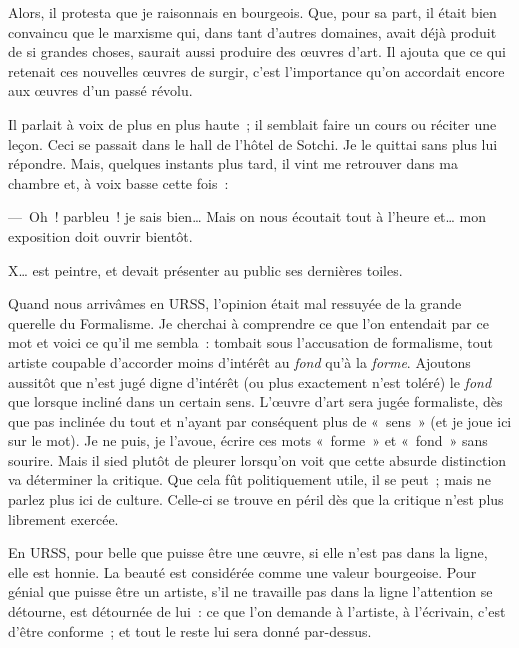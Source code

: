\documentclass[twoside]{book} %
\newcommand{\astermono}{\medskip\centerline{\color{rubric}\large\selectfont{\syms ✻}}\medskip\par}%
\begin{document}
Alors, il protesta que je raisonnais en bourgeois. Que, pour sa part, il était bien convaincu que le marxisme qui, dans tant d’autres domaines, avait déjà produit de si grandes choses, saurait aussi produire des œuvres d’art. Il ajouta que ce qui retenait ces nouvelles œuvres de surgir, c’est l’importance qu’on accordait encore aux œuvres d’un passé révolu.\par
Il parlait à voix de plus en plus haute ; il semblait faire un cours ou réciter une leçon. Ceci se passait dans le hall de l’hôtel de Sotchi. Je le quittai sans plus lui répondre. Mais, quelques instants plus tard, il vint me retrouver dans ma chambre et, à voix basse cette fois :\par
— Oh ! parbleu ! je sais bien… Mais on nous écoutait tout à l’heure et… mon exposition doit ouvrir bientôt.\par
X… est peintre, et devait présenter au public ses dernières toiles.\par

\astermono

\noindent Quand nous arrivâmes en URSS, l’opinion était mal ressuyée de la grande querelle du Formalisme. Je cherchai à comprendre ce que l’on entendait par ce mot et voici ce qu’il me sembla : tombait sous l’accusation de formalisme, tout artiste coupable d’accorder moins d’intérêt au \emph{fond} qu’à la \emph{forme}. Ajoutons aussitôt que n’est jugé digne d’intérêt (ou plus exactement n’est toléré) le \emph{fond} que lorsque incliné dans un certain sens. L’œuvre d’art sera jugée formaliste, dès que pas inclinée du tout et n’ayant par conséquent plus de « sens » (et je joue ici sur le mot). Je ne puis, je l’avoue, écrire ces mots « forme » et « fond » sans sourire. Mais il sied plutôt de pleurer lorsqu’on voit que cette absurde distinction va déterminer la critique. Que cela fût politiquement utile, il se peut ; mais ne parlez plus ici de culture. Celle-ci se trouve en péril dès que la critique n’est plus librement exercée.\par
En URSS, pour belle que puisse être une œuvre, si elle n’est pas dans la ligne, elle est honnie. La beauté est considérée comme une valeur bourgeoise. Pour génial que puisse être un artiste, s’il ne travaille pas dans la ligne l’attention se détourne, est détournée de lui : ce que l’on demande à l’artiste, à l’écrivain, c’est d’être conforme ; et tout le reste lui sera donné par-dessus.\par

\astermono
\end{document}
